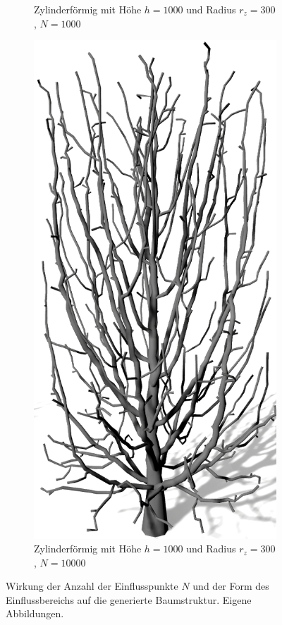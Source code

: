 \begin{figure} [hbtp]
\begin{subfigure}[t]{.45\textwidth}
		\caption{Zylinderförmig mit Höhe $h=1000$ und Radius $r_z = 300$, $N = 1000$}
		\label{subfig:SCA_Einfluss_Cylinder_Low}
	\end{subfigure}
	\hspace{.05\linewidth}
	\begin{subfigure}[t]{.45\textwidth}
		\centering
		\includegraphics[height=.21\textheight]{images/SCA_Einfluss_Cylinder_High.png}
		\caption{Zylinderförmig mit Höhe $h=1000$ und Radius $r_z = 300$, $N = 10000$}
		\label{subfig:SCA_Einfluss_Cylinder_High}
	\end{subfigure}
	\caption{Wirkung der Anzahl der Einflusspunkte $N$ und der Form des Einflussbereichs auf die generierte Baumstruktur. Eigene Abbildungen.}
	\label{fig:SCA_Einfluss}
\end{figure}
 
